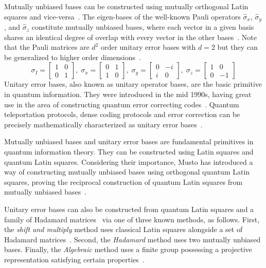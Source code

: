 Mutually unbiased bases can be constructed using mutually orthogonal Latin squares and vice-versa~\cite{wocjan2005NewConstructionMutually, rao2010MutuallyOrthogonalLatin}.
The eigen-bases of the well-known Pauli operators $\hat{\sigma}_x$, $\hat{\sigma}_y$, and $\hat{\sigma}_z$ constitute mutually unbiased bases, where each vector in a given basis shares an identical degree of overlap with every vector in the other bases~\cite{paterek2009MutuallyUnbiasedBases}.
Note that the Pauli matrices are $d^2$ order unitary error bases with $d=2$ but they can be generalized to higher order dimensions~\cite{klappenecker2003UnitaryErrorBases}.
{\small
\begin{equation*}
    \sigma_I = \begin{bmatrix} 1 & 0  \\ 0 & 1  \end{bmatrix}, \;
    \sigma_x = \begin{bmatrix} 0 & 1  \\ 1 & 0  \end{bmatrix}, \;
    \sigma_y = \begin{bmatrix} 0 & -i \\ i & 0  \end{bmatrix}, \;
    \sigma_z = \begin{bmatrix} 1 & 0  \\ 0 & -1 \end{bmatrix}
\end{equation*}
}
Unitary error bases, also known as unitary operator bases, are the basic primitive in quantum information.
They were introduced in the mid 1990s, having great use in the area of constructing quantum error correcting codes~\cite{knill1996NonBinaryUnitary, knill1996GroupRepresentationsError, knill1996ConcatenatedQuantumCodes}. 
Quantum teleportation protocols, dense coding protocols and error correction can be precisely mathematically characterized as unitary error bases~\cite{klappenecker2003UnitaryErrorBases}.

Mutually unbiased bases and unitary error bases are fundamental primitives in quantum information theory.
They can be constructed using Latin squares and quantum Latin squares.
Considering their importance, Musto has introduced a way of constructing mutually unbiased bases using orthogonal quantum Latin squares, proving the reciprocal construction of quantum Latin squares from mutually unbiased bases~\cite{musto2017ConstructingMutuallyUnbiased}.

Unitary error bases can also be constructed from quantum Latin squares and a family of Hadamard matrices~\cite{vicary2016QuantumLatinSquares} via one of three known methods, as follows.
First, the \emph{shift and multiply} method uses classical Latin squares alongside a set of Hadamard matrices~\cite{werner2001AllTeleportationDense}.
Second, the \emph{Hadamard} method uses two mutually unbiased bases.
Finally, the \emph{Algebraic} method uses a finite group possessing a projective representation satisfying certain properties~\cite{knill1996GroupRepresentationsError}.


